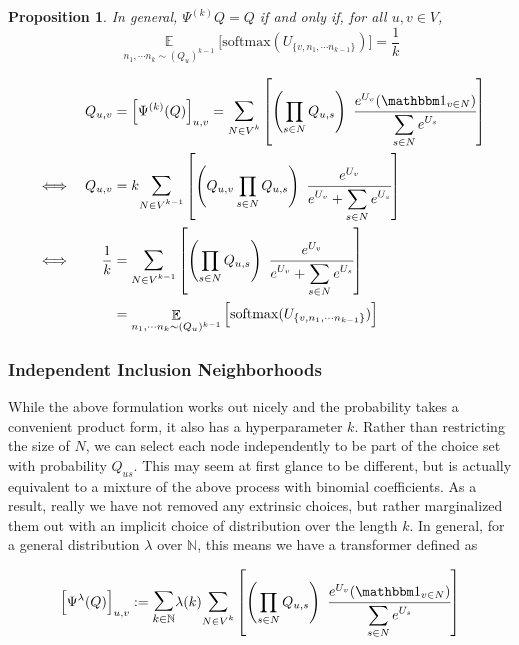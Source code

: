\documentclass{article}
\newtheorem{prop}{Proposition}
\theoremstyle{definition}
\begin{document}
	\begin{prop}
		In general, $\Psi^{(k)}Q = Q$ if and only if, for all $u, v \in V$, \[\displaystyle\mathop{\mathbb E}\limits_{n_1, \cdots n_k \sim (Q_u)^{k-1}} \Big[\mathrm{softmax}(U_{\{v, n_1, \cdots n_{k-1}\}})\Big] = \frac{1}{k}\]
	\end{prop}
	\begin{prf}
		\begin{align*}
			&&Q_{u,v} &= \Big[\Psi^{(k)}(Q)\Big]_{u,v} = \mathlarger{\sum}_{N \in V^{k}} \left[\left(\prod_{s \in N}Q_{u,s}\right) ~\cfrac{ e^{U_v}  (\mathbbm 1_{v \in N})}{ \displaystyle \sum\limits_{ s \in N } e^{U_s} } \right] \\
			&\iff& Q_{u,v} &= k \mathlarger{\sum}_{N \in V^{k-1}} \left[\left(Q_{u,v}\prod_{s \in N}Q_{u,s}\right) ~\cfrac{ e^{U_v} }{ \displaystyle e^{U_v}+\sum\limits_{ s \in N } e^{U_s} } \right] \\
			&\iff& \frac{1}{k} &=\mathlarger{\sum}_{N \in V^{k-1}} \left[\left(\prod_{s \in N}Q_{u,s}\right) ~\cfrac{ e^{U_v} }{ \displaystyle e^{U_v}+\sum\limits_{ s \in N } e^{U_s} } \right] \\
			&& &= \mathop{\mathbb E}\limits_{n_1, \cdots n_k \sim (Q_u)^{k-1}} \Big[\mathrm{softmax}(U_{\{v, n_1, \cdots n_{k-1}\}})\Big]
		\end{align*}
	\end{prf}


	\subsubsection{Independent Inclusion Neighborhoods}
	While the above formulation works out nicely and the probability takes a convenient product form, it also has a hyperparameter $k$. Rather than restricting the size of $N$, we can select each node independently to be part of the choice set with probability $Q_{us}$. This may seem at first glance to be different, but is actually equivalent to a mixture of the above process with binomial coefficients. As a result, really we have not removed any extrinsic choices, but rather marginalized them out with an implicit choice of distribution over the length $k$. In general, for a general distribution $\lambda$ over $\mathbb N$, this means we have a transformer defined as 
	
	\begin{equation*}
		\Big[\Psi^{\lambda}(Q)\Big]_{u,v} := \mathlarger{\mathlarger\sum}_{k \in \mathbb N} \lambda(k) \mathlarger{\sum}_{N \in V^{k}} \left[\left(\prod_{s \in N}Q_{u,s}\right) ~\cfrac{ e^{U_v}  (\mathbbm 1_{v \in N})}{ \displaystyle \sum\limits_{ s \in N } e^{U_s} } \right]
	\end{equation*}
	
\end{document}

